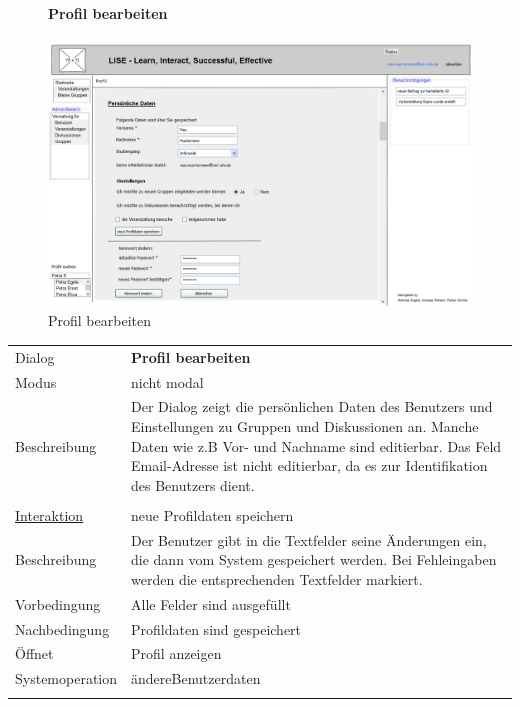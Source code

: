 \documentclass[12pt,a4paper]{article}
\begin{document}
{\begin{figure}[H]
	\paragraph{Profil bearbeiten}
	\includegraphics[width=\textwidth]{Bilder/Mockups/GUI/ProfilBearbeiten.png}
	\caption{Profil bearbeiten}
	\label{ProfilBearbeiten}
\end{figure}

\begin{tabular}{l p{12cm}}
Dialog 	 & \textbf{Profil bearbeiten} \\ 
Modus & nicht modal\\ 
Beschreibung   	 & Der Dialog zeigt die persönlichen Daten des Benutzers und Einstellungen zu Gruppen und Diskussionen an. Manche Daten wie z.B Vor- und Nachname sind editierbar. Das Feld Email-Adresse ist nicht editierbar, da es zur Identifikation des Benutzers dient.\\\\

\underline{Interaktion}  	 & neue Profildaten speichern\\ 
Beschreibung   	 & Der Benutzer gibt in die Textfelder seine Änderungen ein, die dann vom System gespeichert werden. Bei Fehleingaben werden die entsprechenden Textfelder markiert.\\
Vorbedingung   	 & Alle Felder sind ausgefüllt\\
Nachbedingung 	 & Profildaten sind gespeichert\\
Öffnet			 & \glqq Profil anzeigen\grqq\\
Systemoperation & ändereBenutzerdaten\\\\
\end{tabular}\\\\

}
\end{document}
